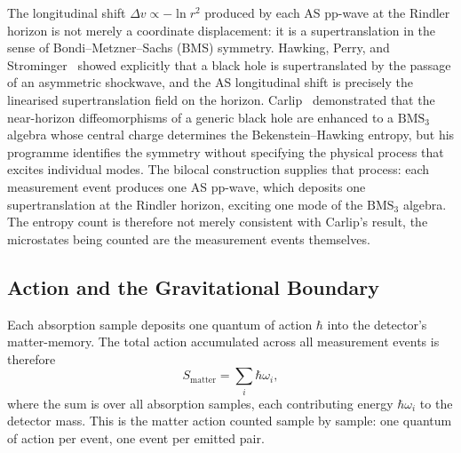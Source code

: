 \documentclass[12pt,a4paper]{article}
\begin{document}
The longitudinal shift $\Delta v \propto -\ln r^2$ produced by each 
AS pp-wave at the Rindler horizon is not merely a coordinate 
displacement: it is a supertranslation in the sense of 
Bondi--Metzner--Sachs (BMS) symmetry. Hawking, Perry, and 
Strominger~\cite{hawking2016soft} showed explicitly that a black 
hole is supertranslated by the passage of an asymmetric shockwave, 
and the AS longitudinal shift is precisely the linearised 
supertranslation field on the horizon. Carlip~\cite{carlip2018bms} 
demonstrated that the near-horizon diffeomorphisms of a generic 
black hole are enhanced to a $\mathrm{BMS}_3$ algebra whose central 
charge determines the Bekenstein--Hawking entropy, but his programme 
identifies the symmetry without specifying the physical process that 
excites individual modes. The bilocal construction supplies that 
process: each measurement event produces one AS pp-wave, which 
deposits one supertranslation at the Rindler horizon, exciting one 
mode of the $\mathrm{BMS}_3$ algebra. The entropy count is therefore 
not merely consistent with Carlip's result, the microstates being 
counted are the measurement events themselves.

\subsection{Action and the Gravitational Boundary}
\label{sec:microstate_action}

Each absorption sample deposits one quantum of action $\hbar$ into 
the detector's matter-memory. The total action accumulated across 
all measurement events is therefore
%
\begin{equation}
S_{\text{matter}} = \sum_i \hbar\omega_i,
\end{equation}
%
where the sum is over all absorption samples, each contributing 
energy $\hbar\omega_i$ to the detector mass. This is the 
matter action counted sample by sample: one quantum of action 
per event, one event per emitted pair.
\end{document}
